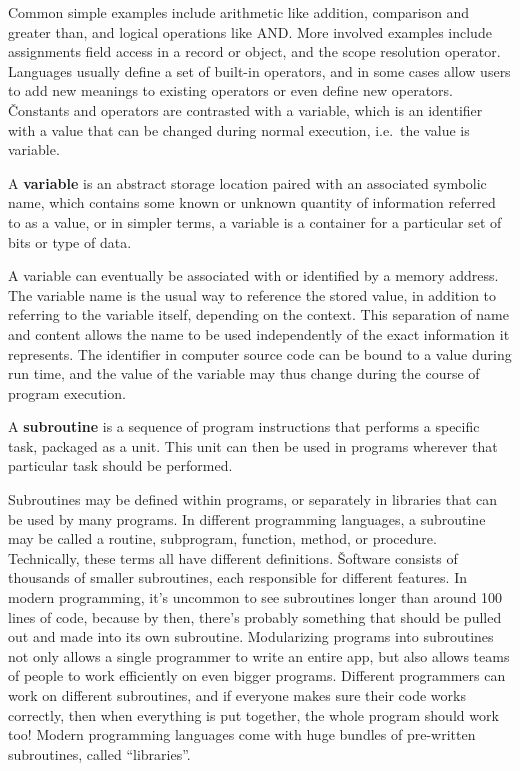 Common simple examples include arithmetic like addition, comparison and greater than, and logical operations like AND.
More involved examples include assignments field access in a record or object, and the scope resolution operator.
Languages usually define a set of built-in operators, and in some cases allow users to add new meanings to existing
operators or even define new operators. \v

Constants and operators are contrasted with a variable, which is an identifier with a value that can be changed
during normal execution, i.e.\ the value is variable.

\bd[Variable]
A \textbf{variable} is an abstract storage location paired with an associated symbolic name, which contains some
known or unknown quantity of information referred to as a value, or in simpler terms, a variable is a container for a
particular set of bits or type of data.
\ed

A variable can eventually be associated with or identified by a memory address. The variable name is the usual way to
reference the stored value, in addition to referring to the variable itself, depending on the context. This
separation of name and content allows the name to be used independently of the exact information it represents. The
identifier in computer source code can be bound to a value during run time, and the value of the variable may thus
change during the course of program execution.

\bd[Subroutine]
A \textbf{subroutine} is a sequence of program instructions that performs a specific task, packaged as a unit. This
unit can then be used in programs wherever that particular task should be performed.
\ed

Subroutines may be defined within programs, or separately in libraries that can be used by many programs. In
different programming languages, a subroutine may be called a routine, subprogram, function, method, or procedure.
Technically, these terms all have different definitions. \v

Software consists of thousands of smaller subroutines, each responsible for different features. In modern
programming, it's uncommon to see subroutines longer than around 100 lines of code, because by then, there's probably
something that should be pulled out and made into its own subroutine. Modularizing programs into subroutines not only
allows a single programmer to write an entire app, but also allows teams of people to work efficiently on even bigger
programs. Different programmers can work on different subroutines, and if everyone makes sure their code works
correctly, then when everything is put together, the whole program should work too! Modern programming languages come
with huge bundles of pre-written subroutines, called ``libraries''.

